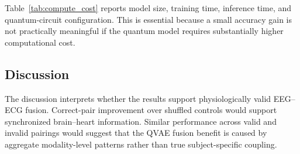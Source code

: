 Table~\ref{tab:compute_cost} reports model size, training time, inference time, and quantum-circuit configuration. This is essential because a small accuracy gain is not practically meaningful if the quantum model requires substantially higher computational cost.

\subsection{Discussion}

The discussion interprets whether the results support physiologically valid EEG--ECG fusion. Correct-pair improvement over shuffled controls would support synchronized brain--heart information. Similar performance across valid and invalid pairings would suggest that the QVAE fusion benefit is caused by aggregate modality-level patterns rather than true subject-specific coupling.
